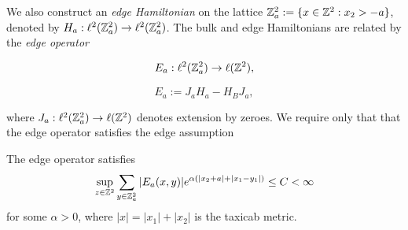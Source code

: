 \documentclass[12pt, letterpaper]{article}
\begin{document}

We also construct an \emph{edge Hamiltonian} on the lattice $\mathbb{Z}^2_a := \{x \in \mathbb{Z}^2 : x_2 > -a\}$, denoted by $H_a:\ell^2(\mathbb{Z}^2_a) \to \ell^2(\mathbb{Z}^2_a)$. The bulk and edge Hamiltonians are related by the \emph{edge operator}

\[E_a : \ell^2(\mathbb{Z}^2_a) \to \ell(\mathbb{Z}^2),\]

\[E_a := J_aH_a - H_BJ_a,\]

where $J_a : \ell^2(\mathbb{Z}_a^2) \to \ell(\mathbb{Z}^2)$ denotes extension by zeroes. We require only that that the edge operator satisfies the edge assumption

\begin{assumption}
The edge operator satisfies
\[\sup_{z\in\mathbb{Z}^2}\sum_{y\in\mathbb{Z}^2_a} |E_a(x,y)| e^{\alpha(|x_2 + a| + |x_1-y_1|)} \leq C < \infty\]
for some $\alpha>0$, where $|x| = |x_1|+|x_2|$ is the taxicab metric.
\label{ass:edge}
\end{assumption}








\end{document}
